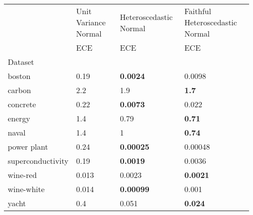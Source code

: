 \begin{tabular}{l|l|l|l}
\toprule
 & Unit Variance Normal & Heteroscedastic Normal & Faithful Heteroscedastic Normal \\
 & ECE & ECE & ECE \\
Dataset &  &  &  \\
\midrule
boston & 0.19 & \bfseries 0.0024 & 0.0098 \\
carbon & 2.2 & 1.9 & \bfseries 1.7 \\
concrete & 0.22 & \bfseries 0.0073 & 0.022 \\
energy & 1.4 & 0.79 & \bfseries 0.71 \\
naval & 1.4 & 1 & \bfseries 0.74 \\
power plant & 0.24 & \bfseries 0.00025 & 0.00048 \\
superconductivity & 0.19 & \bfseries 0.0019 & 0.0036 \\
wine-red & 0.013 & 0.0023 & \bfseries 0.0021 \\
wine-white & 0.014 & \bfseries 0.00099 & 0.001 \\
yacht & 0.4 & 0.051 & \bfseries 0.024 \\
\bottomrule
\end{tabular}
